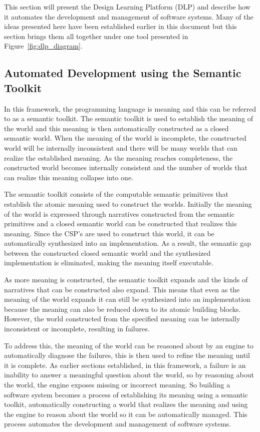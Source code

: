 This section will present the Design Learning Platform (DLP) and describe how it automates the development and management of software systems. Many of the ideas presented here have been established earlier in this document but this section brings them all together under one tool presented in Figure~\ref{fig:dlp_diagram}.

\subsection{Automated Development using the Semantic Toolkit}

In this framework, the programming language is meaning and this can be referred to as a semantic toolkit. The semantic toolkit is used to establish the meaning of the world and this meaning is then automatically constructed as a closed semantic world. When the meaning of the world is incomplete, the constructed world will be internally inconsistent and there will be many worlds that can realize the established meaning. As the meaning reaches completeness, the constructed world becomes internally consistent and the number of worlds that can realize this meaning collapse into one.

The semantic toolkit consists of the computable semantic primitives that establish the atomic meaning used to construct the worlds. Initially the meaning of the world is expressed through narratives constructed from the semantic primitives and a closed semantic world can be constructed that realizes this meaning. Since the CSP's are used to construct this world, it can be automatically synthesized into an implementation. As a result, the semantic gap between the constructed closed semantic world and the synthesized implementation is eliminated, making the meaning itself executable.

As more meaning is constructed, the semantic toolkit expands and the kinds of narratives that can be constructed also expand. This means that even as the meaning of the world expands it can still be synthesized into an implementation because the meaning can also be reduced down to its atomic building blocks. However, the world constructed from the specified meaning can be internally inconsistent or incomplete, resulting in failures. 

To address this, the meaning of the world can be reasoned about by an engine to automatically diagnose the failures, this is then used to refine the meaning until it is complete. As earlier sections established, in this framework, a failure is an inability to answer a meaningful question about the world, so by reasoning about the world, the engine exposes missing or incorrect meaning. So building a software system becomes a process of establishing its meaning using a semantic toolkit, automatically constructing a world that realizes the meaning and using the engine to reason about the world so it can be automatically managed. This process automates the development and management of software systems.

